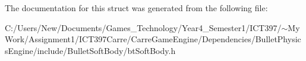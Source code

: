The documentation for this struct was generated from the following file:\begin{CompactItemize}
\item 
C:/Users/New/Documents/Games\_\-Technology/Year4\_\-Semester1/ICT397/$\sim$My Work/Assignment1/ICT397Carre/CarreGameEngine/Dependencies/BulletPhysicsEngine/include/BulletSoftBody/btSoftBody.h\end{CompactItemize}

